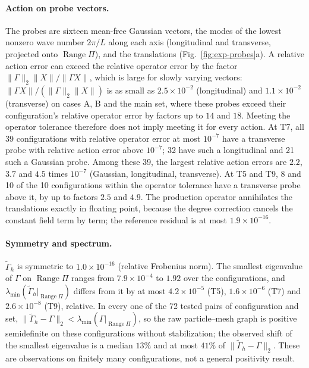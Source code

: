 \documentclass[11pt]{article}
\theoremstyle{plain}
\newcommand{\Range}{\operatorname{Range}}
\DeclareRobustCommand{\_}{\textunderscore\allowbreak}
\begin{document}
\paragraph{Action on probe vectors.}
The probes are sixteen mean-free Gaussian vectors, the modes of the lowest
nonzero wave number $2\pi/L$ along each axis (longitudinal and transverse,
projected onto $\Range\Pi$), and the translations
(Fig.~\ref{fig:exp-probes}a). A relative action error can exceed the relative
operator error by the factor $\|\Gamma\|_2\|X\|/\|\Gamma X\|$, which is large
for slowly varying vectors: $\|\Gamma X\|/(\|\Gamma\|_2\|X\|)$ is as small as
$2.5\times10^{-2}$ (longitudinal) and $1.1\times10^{-2}$ (transverse) on cases A,
B and the main set, where these probes exceed their configuration's relative
operator error by factors up to $14$ and $18$. Meeting the operator tolerance
therefore does not imply meeting it for every action. At T7, all 39
configurations with relative operator error at most $10^{-7}$ have a
transverse probe with relative action error above $10^{-7}$; 32 have such a
longitudinal and 21 such a Gaussian probe. Among these 39, the largest
relative action errors are $2.2$, $3.7$ and $4.5$ times $10^{-7}$ (Gaussian,
longitudinal, transverse). At T5 and T9, 8 and 10 of the 10 configurations
within the operator tolerance have a transverse probe above it, by up to
factors $2.5$ and $4.9$. The production operator annihilates the translations
exactly in floating point, because the degree correction cancels the constant
field term by term; the reference residual is at most $1.9\times10^{-16}$.

\paragraph{Symmetry and spectrum.}
$\widetilde\Gamma_h$ is symmetric to $1.0\times10^{-16}$ (relative Frobenius
norm). The smallest eigenvalue of $\Gamma$ on $\Range\Pi$ ranges from
$7.9\times10^{-4}$ to $1.92$ over the configurations, and
$\lambda_{\min}(\widetilde\Gamma_h|_{\Range\Pi})$ differs from it by at most
$4.2\times10^{-5}$ (T5), $1.6\times10^{-6}$ (T7) and $2.6\times10^{-8}$ (T9),
relative. In every one of the 72 tested pairs of configuration and set,
$\|\widetilde\Gamma_h-\Gamma\|_2<\lambda_{\min}(\Gamma|_{\Range\Pi})$, so the
raw particle--mesh graph is positive semidefinite on these configurations
without stabilization; the observed shift of the smallest eigenvalue is a
median $13\%$ and at most $41\%$ of $\|\widetilde\Gamma_h-\Gamma\|_2$. These are
observations on finitely many configurations, not a general positivity
result.
\end{document}
